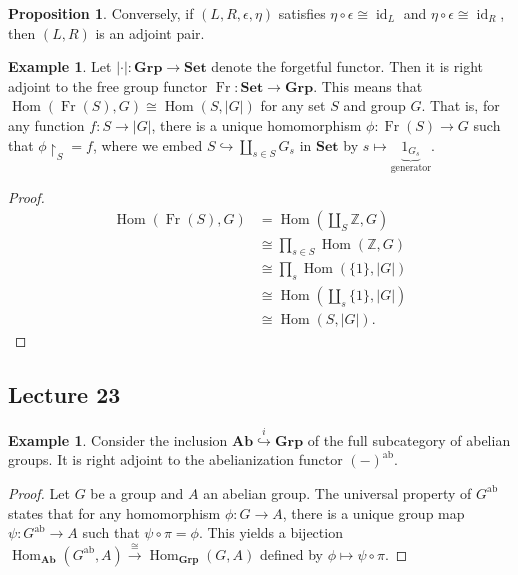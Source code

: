 \documentclass[10pt,letterpaper,cm]{nupset}
\theoremstyle{definition}
\newtheorem{exmp}[definition]{Example}
\theoremstyle{theorem}
\newtheorem{prop}[definition]{Proposition}
\theoremstyle{remark}
\newcommand{\Z}{\mathbb Z}
\newcommand{\1}{\mathbf{1}}
\newcommand{\0}{\vec 0}
\DeclareMathOperator{\id}{\mathrm{id}}
\DeclareMathOperator{\ab}{ab}
\DeclareMathOperator{\Hom}{Hom}
\DeclareMathOperator{\Fr}{Fr}
\begin{document}
\begin{prop}
Conversely, if $\left(L, R, \epsilon, \eta\right)$ satisfies $\eta \circ \epsilon \cong \id_L$ and $\eta \circ \epsilon \cong \id_R$, then $\left(L, R\right)$ is an adjoint pair.
\end{prop}

\begin{exmp}
 Let $\left\lvert{\cdot}\right\rvert : \mathbf{Grp} \to \mathbf{Set}$ denote the forgetful functor. Then it is right adjoint to the free group functor $\Fr : \mathbf{Set} \to \mathbf{Grp}$. This means that $\Hom(\Fr(S), G) \cong \Hom(S, \left\lvert{G}\right\rvert)$ for any set $S$ and group $G$. That is, for any function $f: S \to \left\lvert{G}\right\rvert$, there is a unique homomorphism $\phi : \Fr(S) \to G$ such that $\phi \restriction_S = f$, where we embed $S \hookrightarrow \coprod_{s\in S} G_s$ in $\mathbf{Set}$ by $s\mapsto \underbrace{1_{G_s}}_{\text{generator}}$.
 \end{exmp}
\begin{proof}
\begin{align*}
 \Hom(\Fr(S), G) & = \Hom\left(\coprod_S \Z, G\right) 
 \\ & \cong  \prod_{s\in S} \Hom(\Z, G) 
 \\ & \cong \prod_s \Hom\left(\{1\}, \left\lvert{G}\right\rvert\right)
 \\ &  \cong \Hom\left(\coprod_s \{1\}, \left\lvert{G}\right\rvert\right) 
 \\ & \cong  \Hom\left(S, \left\lvert{G}\right\rvert\right).
 \end{align*}
\end{proof}

\subsection{Lecture 23}

\begin{exmp}  Consider the inclusion  $\mathbf{Ab} \overset{i}{\hookrightarrow} \mathbf{Grp}$ of the full subcategory of abelian groups. It is right adjoint to the abelianization functor $\left({-}\right)^{\ab}$.
\end{exmp}
\begin{proof}
Let $G$ be a group and $A$ an abelian group. The universal property of $G^{\ab}$ states that for any homomorphism $\phi : G \to A$, there is a unique group map $\psi : G^{\ab} \to A$ such that $ \psi \circ \pi = \phi$. This yields a bijection $\Hom_{\mathbf{Ab}}(G^{\ab}, A) \overset{\cong}{\longrightarrow} \Hom_{\mathbf{Grp}}(G, A)$ defined by $\phi \mapsto \psi \circ \pi$.
\end{proof}
\end{document}

